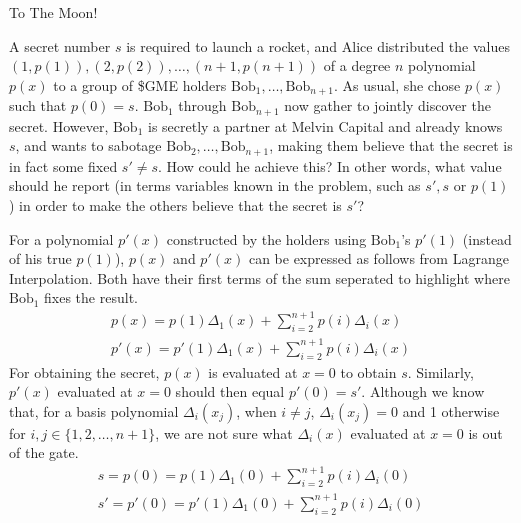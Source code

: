 \begin{homeworkProblem}{To The Moon!}

    A secret number $s$ is required to launch a rocket, and Alice distributed 
    the values $(1,p(1)), (2,p(2)), \dots, 
    (n+1,p(n+1))$ of a degree $n$ polynomial $p(x)$ to a group of 
    \$GME holders $\text{Bob}_1, \dots, \text{Bob}_{n+1}$. As usual, she chose 
    $p(x)$ such that $p(0) = s$. $\text{Bob}_1$ through $\text{Bob}_{n+1}$ now 
    gather to jointly discover the secret. However, $\text{Bob}_1$ is secretly 
    a partner at Melvin Capital and already knows $s$, and wants to sabotage 
    $\text{Bob}_2,\dots, \text{Bob}_{n+1}$, making them believe that the secret 
    is in fact some fixed $s' \neq s$. How could he achieve this? In other 
    words, what value should he report (in terms variables known in the 
    problem, such as $s', s$ or $p(1)$) in order to make the others believe 
    that the secret is $s'$?

    \solution
    For a polynomial $p'(x)$ constructed by the holders using $\text{Bob}_1$'s
    $p'(1)$ (instead of his true $p(1)$), $p(x)$ and $p'(x)$ can be expressed as 
    follows from Lagrange Interpolation. Both have their first terms of the sum 
    seperated to highlight where $\text{Bob}_1$ fixes the result. 
    \[
        \begin{split}
            p(x) = p(1)\Delta_1(x)+ \sum_{i=2}^{n+1} p(i)\Delta_i(x) \\
            p'(x) = p'(1)\Delta_1(x)+ \sum_{i=2}^{n+1} p(i)\Delta_i(x)
        \end{split}
    \]
    For obtaining the secret, $p(x)$ is evaluated at $x=0$ to obtain $s$.
    Similarly, $p'(x)$ evaluated at $x=0$ should then equal $p'(0) = s'$. Although we 
    know that, for a basis polynomial $\Delta_i(x_j)$, when $i \not = j$, $\Delta_i(x_j)
    = 0$ and 1 otherwise for $i, j \in \{1, 2, \dots, n+1\}$, we are not sure what 
    $\Delta_i(x)$ evaluated at $x=0$ is out of the gate. 
    \[
        \begin{split}
            s = p(0) = p(1)\Delta_1(0)+ \sum_{i=2}^{n+1} p(i)\Delta_i(0) \\
            s' = p'(0) = p'(1)\Delta_1(0)+ \sum_{i=2}^{n+1} p(i)\Delta_i(0)    
        \end{split}    
    \]
    

\end{homeworkProblem}

